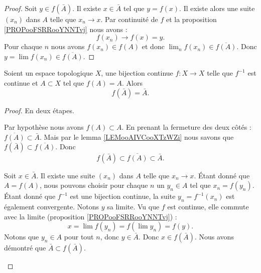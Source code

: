 \begin{proof}
	Soit \( y\in f(\bar A)\). Il existe \( x\in \bar A\) tel que \( y=f(x)\). Il existe alors une suite \( (x_n)\) dans \( A\) telle que \( x_n\to x\). Par continuité de \( f\) et la proposition \ref{PROPooFSRRooYNNTvj} nous avons :
	\begin{equation}
		f(x_n)\to f(x)=y.
	\end{equation}
	Pour chaque \( n\) nous avons \( f(x_n)\in f(A)\) et donc \( \lim_nf(x_n)\in \overline{f(A)}\). Donc \( y=\lim f(x_n)\in \overline{f(A)}\).
\end{proof}

\begin{lemma} \label{LEMooSCIIooRyRrHA}
	Soient un espace topologique \( X\), une bijection continue \(f \colon X\to X  \) telle que \( f^{-1}\) est continue et \( A\subset X\) tel que \( f(A)=A\). Alors
	\begin{equation}
		f(\bar A)=\bar A.
	\end{equation}
\end{lemma}

\begin{proof}
	En deux étapes.
	\begin{subproof}
		Par hypothèse nous avons \( f(A)\subset A\). En prenant la fermeture des deux côtés : \( \overline{f(A)}\subset \bar A\). Mais par le lemma \ref{LEMooAIVCooXTzWZi} nous savons que \( f(\bar A)\subset \overline{f(A)}\). Donc
		\begin{equation}
			f(\bar A)\subset \overline{f(A)}\subset \bar A.
		\end{equation}

		Soit \( x\in \bar A\). Il existe une suite \( (x_n)\) dans \( A\) telle que \( x_n\to x\). Étant donné que \( A=f(A)\), nous pouvons choisir pour chaque \( n\) un \( y_n\in A\) tel que \( x_n=f(y_n)\). Étant donné que \( f^{-1}\) est une bijection continue, la suite \( y_n=f^{-1}(x_n)\) est également convergente. Notons \( y\) sa limite. Vu que \( f\) est continue, elle commute avec la limite (proposition \ref{PROPooFSRRooYNNTvj}) :
		\begin{equation}
			x=\lim f(y_n)=f(\lim y_n)=f(y).
		\end{equation}
		Notons que \( y_n\in A\) pour tout \( n\), donc \( y\in\bar A\). Donc \( x\in f(\bar A)\). Nous avons démontré que \( \bar A\subset f(\bar A)\).
	\end{subproof}
\end{proof}


